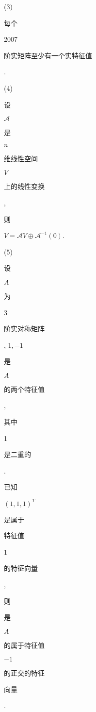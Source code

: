 \documentclass[10pt]{article}
\begin{document}
(3) \begin{CJK}{UTF8}{mj}每个\end{CJK} 2007 \begin{CJK}{UTF8}{mj}阶实矩阵至少有一个实特征值\end{CJK}.

(4) \begin{CJK}{UTF8}{mj}设\end{CJK} $\mathscr{A}$ \begin{CJK}{UTF8}{mj}是\end{CJK} $n$ \begin{CJK}{UTF8}{mj}维线性空间\end{CJK} $V$ \begin{CJK}{UTF8}{mj}上的线性变换\end{CJK}, \begin{CJK}{UTF8}{mj}则\end{CJK} $V=\mathscr{A} V \oplus \mathscr{A}^{-1}(0)$.

(5) \begin{CJK}{UTF8}{mj}设\end{CJK} $A$ \begin{CJK}{UTF8}{mj}为\end{CJK} 3 \begin{CJK}{UTF8}{mj}阶实对称矩阵\end{CJK}, $1,-1$ \begin{CJK}{UTF8}{mj}是\end{CJK} $A$ \begin{CJK}{UTF8}{mj}的两个特征值\end{CJK}, \begin{CJK}{UTF8}{mj}其中\end{CJK} 1 \begin{CJK}{UTF8}{mj}是二重的\end{CJK}. \begin{CJK}{UTF8}{mj}已知\end{CJK} $(1,1,1)^{T}$ \begin{CJK}{UTF8}{mj}是属于\end{CJK} \begin{CJK}{UTF8}{mj}特征值\end{CJK} 1 \begin{CJK}{UTF8}{mj}的特征向量\end{CJK}, \begin{CJK}{UTF8}{mj}则\end{CJK} \begin{CJK}{UTF8}{mj}是\end{CJK} $A$ \begin{CJK}{UTF8}{mj}的属于特征值\end{CJK} $-1$ \begin{CJK}{UTF8}{mj}的正交的特征\end{CJK} \begin{CJK}{UTF8}{mj}向量\end{CJK}.
\end{document}
